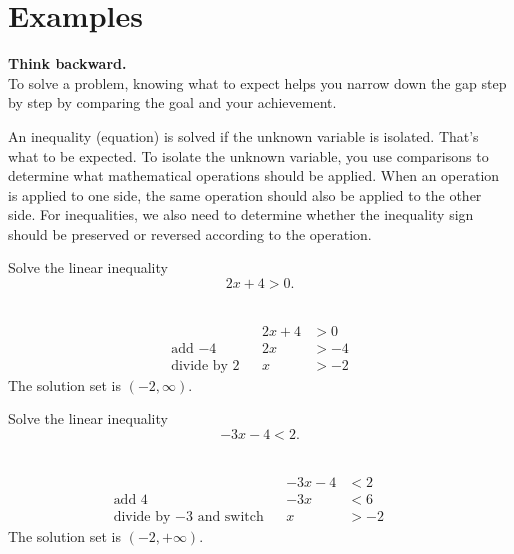 \documentclass[en,11pt]{elegantbook}
\newcommand{\size}[2]{{\fontsize{#1}{0}\selectfont#2}}
\newenvironment{rmdtip}{
	\vspace*{0.5\baselineskip}
	\par\noindent
	\makebox[-3pt][r]{\color{red!90}\size{12}{\HandRight}\,\,}
    \begin{tcolorbox}[
    enhanced,
    title={\textbf{\color{second}Tips}},
    title style={left color=blue!10!green!20!white,right color=yellow!20!blue!20!white},
    colback=cyan!10!white,
    ]
    \sffamily
}{
    \end{tcolorbox}
    \par\ignorespacesafterend
}
\let\BeginKnitrBlock\begin \let\EndKnitrBlock\end
\begin{document}
\hypertarget{examples}{%
\section{Examples}\label{examples}}

\begin{rmdtip}

\textbf{Think backward.}\\
To solve a problem, knowing what to expect helps you narrow down the gap step by step by comparing the goal and your achievement.

An inequality (equation) is solved if the unknown variable is isolated. That's what to be expected. To isolate the unknown variable, you use comparisons to determine what mathematical operations should be applied. When an operation is applied to one side, the same operation should also be applied to the other side. For inequalities, we also need to determine whether the inequality sign should be preserved or reversed according to the operation.

\end{rmdtip}

\BeginKnitrBlock{example}
\protect\hypertarget{exm:unnamed-chunk-193}{}{\label{exm:unnamed-chunk-193} }
Solve the linear inequality
\[
2x+4>0.
\]
\EndKnitrBlock{example}

\BeginKnitrBlock{solution}
{}\\

\[
\begin{aligned}
&  & 2x+4 & >0  \\
    \text{add $-4$}      &  & 2x   & >-4 \\
    \text{divide by $2$} &  & x    & >-2
\end{aligned}
\]
The solution set is \((-2, \infty)\).
\EndKnitrBlock{solution}

\BeginKnitrBlock{example}
\protect\hypertarget{exm:unnamed-chunk-195}{}{\label{exm:unnamed-chunk-195} }
Solve the linear inequality
\[
-3x-4<2.
\]
\EndKnitrBlock{example}

\BeginKnitrBlock{solution}
{}\\

\[
\begin{aligned}
                                        &  & -3x-4 & <2       \\
    \text{add $4$}                   &  & -3x   & <6  &  & \\
    \text{divide by $-3$ and switch} &  & x     & >-2
\end{aligned}
\]
The solution set is \((-2, +\infty)\).
\EndKnitrBlock{solution}
\end{document}
